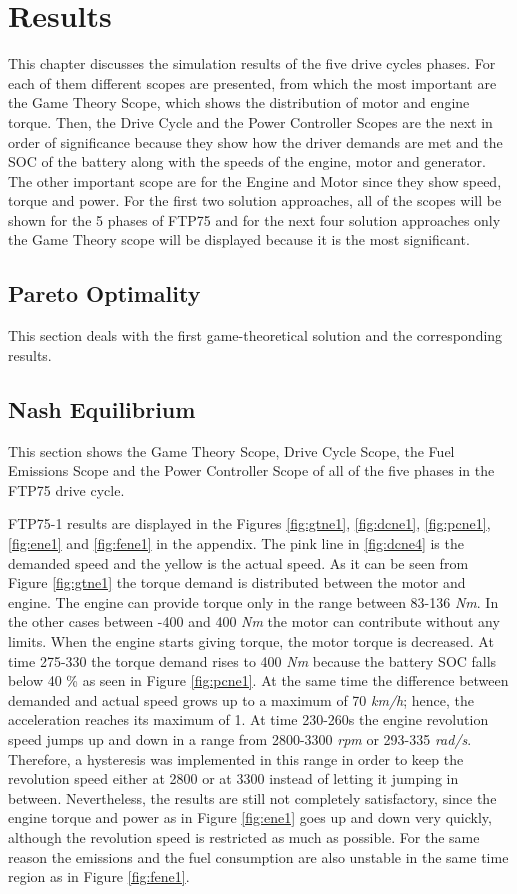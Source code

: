 \chapter{Results}
\label{chp:results}

This chapter discusses the simulation results of the five drive cycles phases. For each of them different scopes are presented, from which the most important are the Game Theory Scope, which shows the distribution of motor and engine torque. Then, the Drive Cycle and the Power Controller Scopes are the next in order of significance because they show how the driver demands are met and the SOC of the battery along with the speeds of the engine, motor and generator. The other important scope are for the Engine and Motor since they show speed, torque and power. For the first two solution approaches, all of the scopes will be shown for the 5 phases of FTP75 and for the next four solution approaches only the Game Theory scope will be displayed because it is the most significant.

\section{Pareto Optimality}
This section deals with the first game-theoretical solution and the corresponding results. 

\section{Nash Equilibrium}
This section shows the Game Theory Scope, Drive Cycle Scope, the Fuel Emissions Scope and the Power Controller Scope of all of the five phases in the FTP75 drive cycle.

FTP75-1 results are displayed in the Figures \ref{fig:gtne1}, \ref{fig:dcne1}, \ref{fig:pcne1}, \ref{fig:ene1} and \ref{fig:fene1} in the appendix. The pink line in \ref{fig:dcne4} is the demanded speed and the yellow is the actual speed. As it can be seen from Figure \ref{fig:gtne1} the torque demand is distributed between the motor and engine. The engine can provide torque only in the range between 83-136 \textit{Nm}. In the other cases between -400 and 400 \textit{Nm} the motor can contribute without any limits. When the engine starts giving torque, the motor torque is decreased. At time 275-330 the torque demand rises to 400 \textit{Nm} because the battery SOC falls below 40 \% as seen in Figure \ref{fig:pcne1}. At the same time the difference between demanded and actual speed grows up to a maximum of 70 \textit{km/h}; hence, the acceleration reaches its maximum of 1. At time 230-260s the engine revolution speed jumps up and down in a range from 2800-3300 \textit{rpm} or 293-335 \textit{rad/s}. Therefore, a hysteresis was implemented in this range in order to keep the revolution speed either at 2800 or at 3300 instead of letting it jumping in between. Nevertheless, the results are still not completely satisfactory, since the engine torque and power as in Figure \ref{fig:ene1} goes up and down very quickly, although the revolution speed is restricted as much as possible. For the same reason the emissions and the fuel consumption are also unstable in the same time region as in Figure \ref{fig:fene1}.

